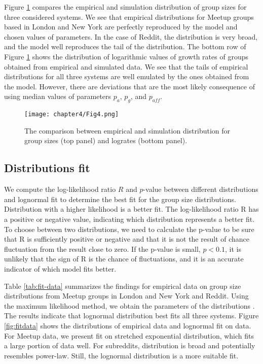Figure \ref{fig:fig6} compares the empirical and simulation distribution of group sizes for three considered systems. We see that empirical distributions for Meetup groups based in London and New York are perfectly reproduced by the model and chosen values of parameters. In the case of Reddit, the distribution is very broad, and the model well reproduces the tail of the distribution.
The bottom row of Figure \ref{fig:fig6} shows the distribution of logarithmic values of growth rates of groups obtained from empirical and simulated data. We see that the tails of empirical distributions for all three systems are well emulated by the ones obtained from the model. However, there are deviations that are the most likely consequence of using median values of parameters $p_{a}$, $p_{g}$, and $p_{aff}$.

\begin{figure}[H]
	\centering
	\texttt{[image: chapter4/Fig4.png]}
	\caption[The comparison between empirical and simulated data.]{The comparison between empirical and simulation distribution for group sizes (top panel) and logrates (bottom panel).}
	\label{fig:fig6}
\end{figure}


\subsection{Distributions fit}

We compute the log-likelihood ratio $R$ and $p$-value between different distributions and lognormal fit \cite{clauset2009power} to determine the best fit for the group size distributions. Distribution with a higher likelihood is a better fit. The log-likelihood ratio R has a positive or negative value, indicating which distribution represents a better fit. To choose between two distributions, we need to calculate the p-value to be sure that R is sufficiently positive or negative and that it is not the result of chance fluctuation from the result close to zero. If the p-value is small, $p<0.1$, it is unlikely that the sign of R is the chance of fluctuations, and it is an accurate indicator of which model fits better.

Table \ref{tab:fit-data} summarizes the findings for empirical data on group size distributions from Meetup groups in London and New York and Reddit. Using the maximum likelihood method, we obtain the parameters of the distributions \cite{power-law}. The results indicate that lognormal distribution best fits all three systems. Figure \ref{fig:fitdata} shows the distributions of empirical data and lognormal fit on data. For Meetup data, we present fit on stretched exponential distribution, which fits a large portion of data well. For subreddits, distribution is broad and potentially resembles power-law. Still, the lognormal distribution is a more suitable fit.

